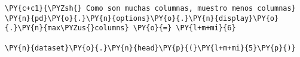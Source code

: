 \begin{table}[H]
\centering
\setlength{\tabcolsep}{5pt}
\caption{Cantidad de pacientes en la clasificación NIHSS de alta}
\label{tab:nihss alta clasificacin}
\end{table}
        
    \begin{tcolorbox}[breakable, size=fbox, boxrule=1pt, pad at break*=1mm,colback=cellbackground, colframe=cellborder]
\begin{Verbatim}[commandchars=\\\{\}]
\PY{c+c1}{\PYZsh{} Como son muchas columnas, muestro menos columnas}
\PY{n}{pd}\PY{o}{.}\PY{n}{options}\PY{o}{.}\PY{n}{display}\PY{o}{.}\PY{n}{max\PYZus{}columns} \PY{o}{=} \PY{l+m+mi}{6}

\PY{n}{dataset}\PY{o}{.}\PY{n}{head}\PY{p}{(}\PY{l+m+mi}{5}\PY{p}{)}
\end{Verbatim}
\end{tcolorbox}

